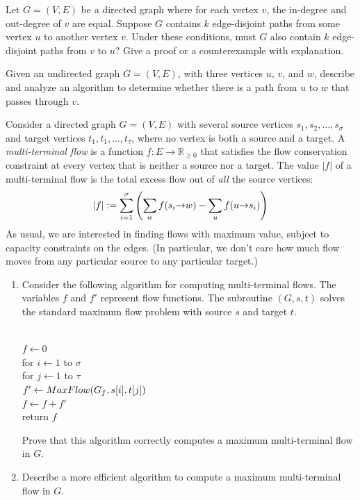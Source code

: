 \begin{exercises}
\item
\label{ex:11.1}
Let $G = (V,E)$ be a directed graph where for each vertex $v$, the in-degree and out-degree of $v$ are equal.
Suppose $G$ contains $k$ edge-disjoint paths from some vertex $u$ to another vertex $v$.
Under these conditions, must $G$ also contain $k$ edge-disjoint paths from $v$ to $u$?
Give a proof or a counterexample with explanation.

\item
\label{ex:11.2}
Given an undirected graph $G = (V,E)$, with three vertices $u$, $v$, and $w$, describe and analyze an algorithm to determine whether there is a path from $u$ to $w$ that passes through $v$.

\item
\label{ex:11.3}
Consider a directed graph $G = (V,E)$ with several source vertices $s_1, s_2, \dots, s_\sigma$ and target vertices $t_1, t_1, \dots, t_\tau$, where no vertex is both a source and a target.
A \textit{multi-terminal flow} is a function $f : E \to \mathbb{R}_{\ge 0}$ that satisfies the flow conservation constraint at every vertex that is neither a source nor a target.
The value $|f|$ of a multi-terminal flow is the total excess flow out of \textit{all} the source vertices:
\[
|f| := \sum_{i=1}^{\sigma} \left( \sum_w f(s_i\mathord{\rightarrow}w) - \sum_u f(u\mathord{\rightarrow}s_i) \right)
\]
As usual, we are interested in finding flows with maximum value, subject to capacity constraints on the edges.
(In particular, we don’t care how much flow moves from any particular source to any particular target.)
\begin{enumerate}
\item Consider the following algorithm for computing multi-terminal flows.
The variables $f$ and $f'$ represent flow functions.
The subroutine $(G, s, t)$ solves the standard maximum flow problem with source $s$ and target $t$.
\begin{pseudocode}
\\
$f \gets 0$ \\
for $i \gets 1$ to $\sigma$\\
\Indent for $j \gets 1$ to $\tau$\\
\Indent\Indent $f' \gets MaxFlow(G_f, s[i], t[j])$\\
\Indent\Indent $f \gets f + f'$ \\
return $f$
\end{pseudocode}
\noindent Prove that this algorithm correctly computes a maximum multi-terminal flow in $G$.
\item Describe a more efficient algorithm to compute a maximum multi-terminal flow in $G$.
\end{enumerate}


\end{exercises}
